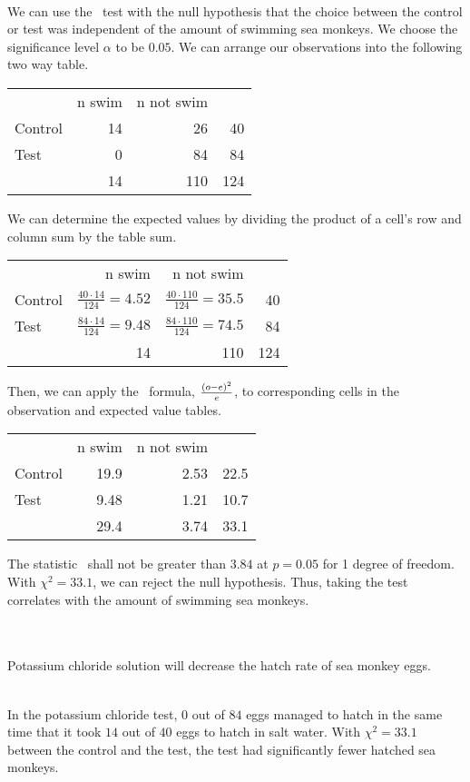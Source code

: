 \documentclass[12pt]{article}
\begin{document}
\\
We can use the \chisq\ test with the null hypothesis that the choice between the control or test was independent of the amount of swimming sea monkeys. We choose the significance level $\alpha$ to be $0.05$. We can arrange our observations into the following two way table.
%
\begin{center}
\begin{tabular}{lrr|r}
& n swim & n not swim & \\
Control & 14 & 26 & 40 \\
Test & 0 & 84 & 84 \\\hline
& 14 & 110 & 124
\end{tabular}
\end{center}
%
We can determine the expected values by dividing the product of a cell's row and column sum by the table sum.
%
\begin{center}
\begin{tabular}{lrr|r}
& n swim & n not swim & \\
Control & $\frac{40\cdot{14}}{124}=4.52$ & $\frac{40\cdot{110}}{124}=35.5$ & 40 \\
Test & $\frac{84\cdot{14}}{124}=9.48$ & $\frac{84\cdot{110}}{124}=74.5$ & 84 \\\hline
& 14 & 110 & 124
\end{tabular}
\end{center}
%
Then, we can apply the \chisq\ formula, $\frac{\left({o-e}\right)^2}{e}$, to corresponding cells in the observation and expected value tables.
%
\begin{center}
\begin{tabular}{lrr|r}
& n swim & n not swim & \\
Control & 19.9 & 2.53 & 22.5 \\
Test & 9.48 & 1.21 & 10.7 \\\hline
& 29.4 & 3.74 & 33.1
\end{tabular}
\end{center}
%
The statistic \chisq\ shall not be greater than $3.84$ at $p=0.05$ for 1 degree of freedom. With $\chi^2=33.1$, we can reject the null hypothesis. Thus, taking the test correlates with the amount of swimming sea monkeys.\double

\\
\\
Potassium chloride solution will decrease the hatch rate of sea monkey eggs.\double

\\
In the potassium chloride test, $0$ out of $84$ eggs managed to hatch in the same time that it took $14$ out of $40$ eggs to hatch in salt water. With $\chi^2=33.1$ between the control and the test, the test had significantly fewer hatched sea monkeys.\double
\end{document}
